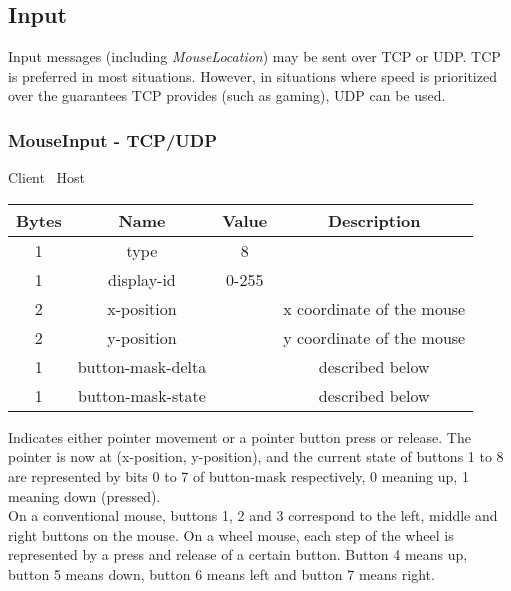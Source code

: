 \subsection{Input}

Input messages (including \emph{MouseLocation}) may be sent over TCP or UDP. TCP is preferred in most situations.
However, in situations where speed is prioritized over the guarantees TCP provides (such as gaming), UDP can be
used.

\subsubsection{MouseInput - TCP/UDP}

\begin{center}
    Client \textrightarrow\ Host\\
    \begin{tabular}{|c|c|c|c|}
        \hline
        \textbf{Bytes} & \textbf{Name}     & \textbf{Value} & \textbf{Description}      \\
        \hline
        1              & type              & 8              &                           \\
        \hline
        1              & display-id        & 0-255          &                           \\
        \hline
        2              & x-position        &                & x coordinate of the mouse \\
        \hline
        2              & y-position        &                & y coordinate of the mouse \\
        \hline
        1              & button-mask-delta &                & described below           \\
        \hline
        1              & button-mask-state &                & described below           \\
        \hline
    \end{tabular}
\end{center}

Indicates either pointer movement or a pointer button press or release. The pointer is now at (x-position,
y-position), and the current state of buttons 1 to 8 are represented by bits 0 to 7 of button-mask respectively,
0 meaning up, 1 meaning down (pressed).\\

On a conventional mouse, buttons 1, 2 and 3 correspond to the left, middle and right buttons on the mouse. On a
wheel mouse, each step of the wheel is represented by a press and release of a certain button. Button 4 means up,
button 5 means down, button 6 means left and button 7 means right.\\

